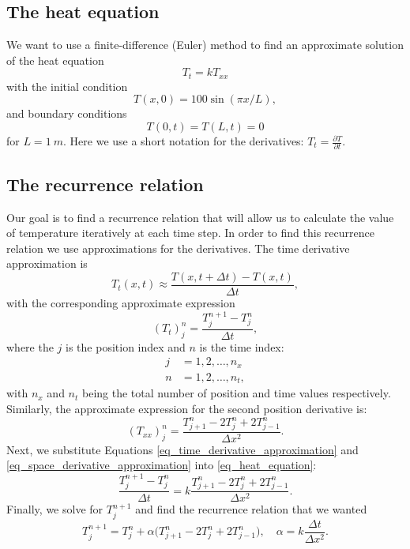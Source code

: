 \subsection{The heat equation}

We want to use a finite-difference (Euler) method to find an approximate solution of the heat equation
\begin{equation}
  T_t = k T_{xx}
  \label{eq_heat_equation}
\end{equation}
with the initial condition
\begin{equation}
  T(x,0) = 100 \sin(\pi x / L),
  \label{eq_initial_condition}
\end{equation}
and boundary conditions
\begin{equation}
  T(0,t) = T(L,t) = 0
  \label{eq_boundary_conditions}
\end{equation}
for $L = 1 \ m$. Here we use a short notation for the derivatives: $T_t = \frac{\partial T}{\partial t}$.


\subsection{The recurrence relation}

Our goal is to find a recurrence relation that will allow us to calculate the value of temperature iteratively at each time step. In order to find this recurrence relation we use approximations for the derivatives. The time derivative approximation is
\[
  T_t(x, t) \approx \frac{T(x, t + \Delta t) - T(x, t)}{\Delta t},
\]
with the corresponding approximate expression
\begin{equation}
  (T_t)_j^n = \frac{T_j^{n + 1} - T_j^{n}}{\Delta t},
  \label{eq_time_derivative_approximation}
\end{equation}
where the $j$ is the position index and $n$ is the time index:
\begin{align*}
  j &= 1, 2, \dots, n_x \\
  n &= 1, 2, \dots, n_t,
\end{align*}
with $n_x$ and $n_t$ being the total number of position and time values respectively.
Similarly, the approximate expression for the second position derivative is:
\begin{equation}
  (T_{xx})_j^n = \frac{T_{j+1}^n - 2 T_{j}^n + 2T_{j-1}^n}{\Delta x^2}.
  \label{eq_space_derivative_approximation}
\end{equation}
Next, we substitute Equations \ref{eq_time_derivative_approximation} and \ref{eq_space_derivative_approximation} into \autoref{eq_heat_equation}:
\[
  \frac{T_j^{n + 1} - T_j^{n}}{\Delta t} = k \frac{T_{j+1}^n - 2 T_{j}^n + 2T_{j-1}^n}{\Delta x^2}.
\]
Finally, we solve for $T_j^{n + 1}$ and find the recurrence relation that we wanted
\begin{equation}
  \boxed{ T_j^{n + 1} = T_j^{n} + \alpha \big( T_{j+1}^n - 2 T_{j}^n + 2T_{j-1}^n \big), \quad \alpha = k \frac{\Delta t}{\Delta x^2}. }
  \label{eq_recurrence_relation_heat_eq}
\end{equation}


